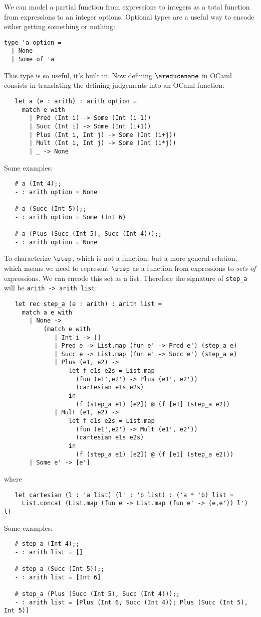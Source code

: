 We can model a partial function from expressions to integers as a
total function from expressions to an integer options.  Optional types
are a useful way to encode either getting something or nothing:
\begin{verbatim}
type 'a option =
  | None
  | Some of 'a
\end{verbatim}
This type is so useful, it's built in.  Now defining $\areducename$ in
OCaml consists in translating the defining judgements into an OCaml
function:
\begin{verbatim}
   let a (e : arith) : arith option =
     match e with
       | Pred (Int i) -> Some (Int (i-1))
       | Succ (Int i) -> Some (Int (i+1))
       | Plus (Int i, Int j) -> Some (Int (i+j))
       | Mult (Int i, Int j) -> Some (Int (i*j))
       | _ -> None
\end{verbatim}
Some examples:
\begin{verbatim}
   # a (Int 4);;
   - : arith option = None

   # a (Succ (Int 5));;
   - : arith option = Some (Int 6)

   # a (Plus (Succ (Int 5), Succ (Int 4)));;
   - : arith option = None
\end{verbatim}

To characterize $\step$, which is not a function, but a more general
relation, which means we need to represent $\step$ as a function from
expressions to \emph{sets of} expressions.  We can encode this set as
a list.  Therefore the signature of {\tt step\_a} will be {\tt arith ->
  arith list}:
\begin{verbatim}
   let rec step_a (e : arith) : arith list =
     match a e with
       | None ->
           (match e with
              | Int i -> []
              | Pred e -> List.map (fun e' -> Pred e') (step_a e)
              | Succ e -> List.map (fun e' -> Succ e') (step_a e)
              | Plus (e1, e2) ->
                  let f e1s e2s = List.map
                    (fun (e1',e2') -> Plus (e1', e2'))
                    (cartesian e1s e2s)
                  in
                    (f (step_a e1) [e2]) @ (f [e1] (step_a e2))
              | Mult (e1, e2) ->
                  let f e1s e2s = List.map
                    (fun (e1',e2') -> Mult (e1', e2'))
                    (cartesian e1s e2s)
                  in
                    (f (step_a e1) [e2]) @ (f [e1] (step_a e2)))
       | Some e' -> [e']
\end{verbatim}
where
\begin{verbatim}
   let cartesian (l : 'a list) (l' : 'b list) : ('a * 'b) list =
     List.concat (List.map (fun e -> List.map (fun e' -> (e,e')) l') l)
\end{verbatim}
Some examples:
\begin{verbatim}
   # step_a (Int 4);;
   - : arith list = []

   # step_a (Succ (Int 5));;
   - : arith list = [Int 6]

   # step_a (Plus (Succ (Int 5), Succ (Int 4)));;
   - : arith list = [Plus (Int 6, Succ (Int 4)); Plus (Succ (Int 5), Int 5)]
\end{verbatim}



